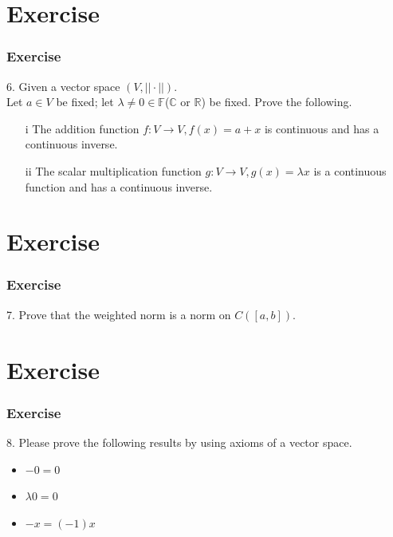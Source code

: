 \documentclass[12pt, t]{beamer}
\begin{document}
\section{Exercise}
\begin{frame}
    \frametitle{Exercise}
6. Given a vector space $(V,||\cdot||)$.\\
Let $a\in V$ be fixed; let $\lambda\neq 0\in \mathbb{F}$($\mathbb{C}$ or $\mathbb{R}$) be fixed. Prove the following. 
\begin{enumerate}
    \item[i]    The addition function $f:V\rightarrow V,f(x)=a+x$ is continuous and has a continuous inverse.
    \item[ii]  The scalar multiplication function $g:V\rightarrow V, g(x)=\lambda x$ is a continuous function and has a continuous inverse.
\end{enumerate}
\end{frame}

\section{Exercise}
\begin{frame}
    \frametitle{Exercise}
7. Prove that the weighted norm is a norm on $C([a,b])$.

\end{frame}

\section{Exercise}
\begin{frame}
    \frametitle{Exercise}
8. Please prove the following results by using axioms of a vector space.
\begin{itemize}
    \item $-0=0$
    \item $\lambda 0=0$
    \item $-x=(-1)x$
\end{itemize}
\end{frame}
\end{document}
